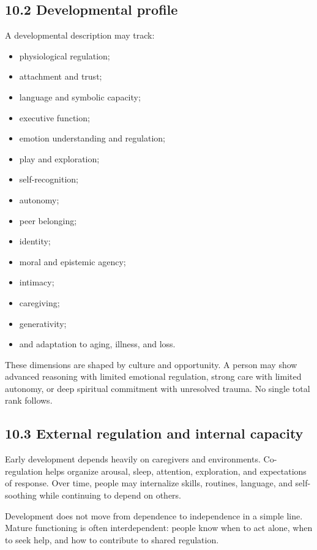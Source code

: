 \documentclass[
  11pt,
]{article}
\providecommand{\tightlist}{%
  \setlength{\itemsep}{0pt}\setlength{\parskip}{0pt}}
\begin{document}
\subsection{10.2 Developmental profile}\label{developmental-profile}

A developmental description may track:

\begin{itemize}
\tightlist
\item
  physiological regulation;
\item
  attachment and trust;
\item
  language and symbolic capacity;
\item
  executive function;
\item
  emotion understanding and regulation;
\item
  play and exploration;
\item
  self-recognition;
\item
  autonomy;
\item
  peer belonging;
\item
  identity;
\item
  moral and epistemic agency;
\item
  intimacy;
\item
  caregiving;
\item
  generativity;
\item
  and adaptation to aging, illness, and loss.
\end{itemize}

These dimensions are shaped by culture and opportunity. A person may
show advanced reasoning with limited emotional regulation, strong care
with limited autonomy, or deep spiritual commitment with unresolved
trauma. No single total rank follows.

\subsection{10.3 External regulation and internal
capacity}\label{external-regulation-and-internal-capacity}

Early development depends heavily on caregivers and environments.
Co-regulation helps organize arousal, sleep, attention, exploration, and
expectations of response. Over time, people may internalize skills,
routines, language, and self-soothing while continuing to depend on
others.

Development does not move from dependence to independence in a simple
line. Mature functioning is often interdependent: people know when to
act alone, when to seek help, and how to contribute to shared
regulation.
\end{document}
